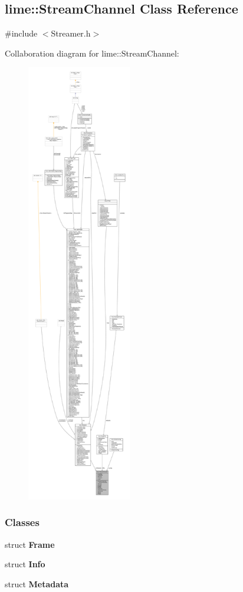 \subsection{lime\+:\+:Stream\+Channel Class Reference}
\label{classlime_1_1StreamChannel}


{\ttfamily \#include $<$Streamer.\+h$>$}



Collaboration diagram for lime\+:\+:Stream\+Channel\+:
\nopagebreak
\begin{figure}[H]
\begin{center}
\leavevmode
\includegraphics[height=550pt]{d3/d61/classlime_1_1StreamChannel__coll__graph}
\end{center}
\end{figure}
\subsubsection*{Classes}
\begin{DoxyCompactItemize}
\item 
struct {\bf Frame}
\item 
struct {\bf Info}
\item 
struct {\bf Metadata}
\end{DoxyCompactItemize}
